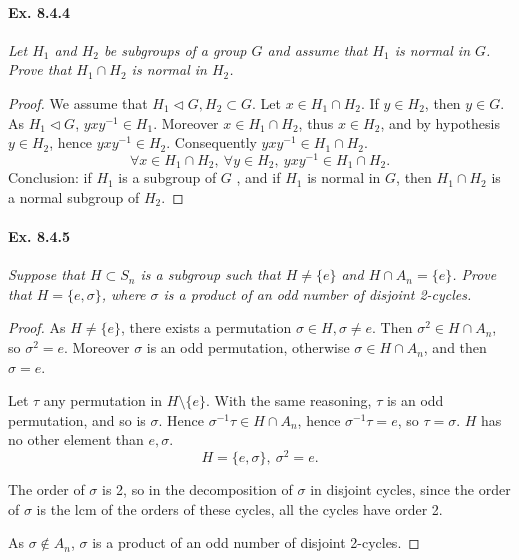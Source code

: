 \documentclass[11pt,a4paper]{article}
\begin{document}
\paragraph{Ex. 8.4.4}

{\it Let $H_1$ and $H_2$ be subgroups of a group $G$ and assume that $H_1$ is normal in $G$. Prove that $H_1\cap H_2$ is normal in $H_2$.
}

\begin{proof}
We assume that $H_1 \lhd G, H_2\subset G$.
Let $x \in H_1 \cap H_2$.
If $y \in H_2$, then $y \in G$. As $H_1 \lhd G$, $yxy^{-1} \in H_1$. Moreover  $x \in H_1 \cap H_2$, thus $x \in H_2$, and  by hypothesis $y\in H_2$, hence $yxy^{-1} \in H_2$. Consequently $yxy^{-1} \in H_1\cap H_2$.
$$\forall x \in H_1\cap H_2,\ \forall y \in H_2, \ yxy^{-1} \in H_1\cap H_2.$$
Conclusion:  if $H_1$ is a subgroup of $G$ , and if $H_1$ is normal in $G$, then  $H_1\cap H_2$ is a normal subgroup of $H_2$.
\end{proof}

\paragraph{Ex. 8.4.5}

{\it Suppose that $H \subset S_n$ is a subgroup such that $H\ne \{e\}$ and $H \cap A_n = \{e\}$. Prove that $H =\{e,\sigma\}$, where $\sigma$ is a product of an odd number of disjoint 2-cycles.
}

\begin{proof}

As   $H\neq \{e\}$, there exists a permutation $\sigma \in H,\sigma \neq e$. Then $\sigma^2 \in H\cap A_n$, so $\sigma^2=e$. Moreover $\sigma$  is an odd permutation, 
otherwise $\sigma \in H\cap  A_n$, and then $ \sigma = e$.

Let $\tau$ any permutation in $H \setminus \{e\}$. With the same reasoning, $\tau$ is an odd permutation, and so is $\sigma$. Hence $\sigma^{-1} \tau \in H \cap A_n$, hence $\sigma^{-1} \tau = e$, so $\tau = \sigma$. $H$ has no other element than $e,\sigma$.
$$H = \{e,\sigma\},\ \sigma^2 = e.$$

The order of $\sigma$ is 2, so in the decomposition of $\sigma$ in disjoint cycles, since the order of $\sigma$ is the lcm of the orders of these cycles, all the cycles have order 2.

As $\sigma \not \in A_n$, $\sigma$ is a product of an odd number of disjoint 2-cycles.
\end{proof}
\end{document}
